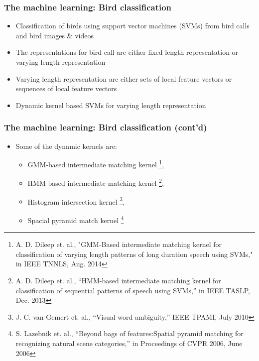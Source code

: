 \documentclass[mathserif]{beamer}
\begin{document}
\begin{frame}
\frametitle{The machine learning: Bird classification}
\begin{itemize}
\item<2-> Classification of birds using support vector machines (SVMs) from bird calls and bird images \& videos
\item<3-> The representations for bird call are either fixed length representation or varying length representation
\item<4-> Varying length representation are either sets of local feature vectors or sequences of local feature vectors
\item<5-> Dynamic kernel based SVMs for varying length representation
\end{itemize}
\end{frame}

\begin{frame}
\frametitle{The machine learning: Bird classification (cont'd)}
\begin{itemize}
\item<2-> Some of the dynamic kernels are:
\begin{itemize}
	\item GMM-based intermediate matching kernel \footnote{
	A. D. Dileep et. al., "GMM-Based intermediate matching kernel for classification of varying length patterns of long duration speech using SVMs," in IEEE TNNLS, Aug. 2014},
	\item HMM-based intermediate matching kernel \footnote{A. D. Dileep et. al., “HMM-based intermediate matching kernel for classification of sequential patterns of speech using SVMs,” in IEEE TASLP, Dec. 2013}, 
	\item Histogram intersection kernel \footnote{J. C. van Gemert et. al., “Visual word ambiguity,” IEEE TPAMI, July 2010}, 
	\item Spacial pyramid match kernel \footnote{S. Lazebnik et. al., “Beyond bags of features:Spatial pyramid matching for recognizing natural scene categories,” in Proceedings of CVPR 2006, June 2006}
\end{itemize}
\end{itemize}
\end{frame}
\end{document}
